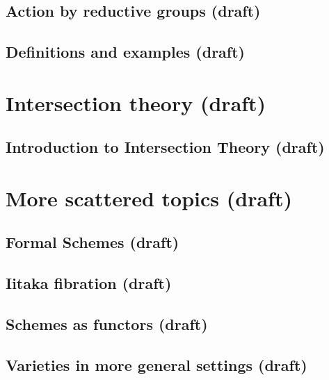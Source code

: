 \documentclass[sectionlevel=book]{noteformyself}
\begin{document}
        \section{Action by reductive groups (draft)}
        
        \section{Definitions and examples (draft)}
        

    \chapter{Intersection theory (draft)}
        \section{Introduction to Intersection Theory (draft)}
        

    \chapter{More scattered topics (draft)}
        \section{Formal Schemes (draft)}
        
        \section{Iitaka fibration (draft)}
        
        \section{Schemes as functors (draft)}
        
        \section{Varieties in more general settings (draft)}
        

    \printbibliography[heading=bibintoc, title={References}]
    
\end{document}
